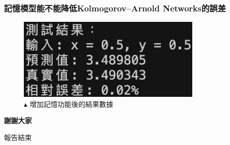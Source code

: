 \documentclass{beamer}
\begin{document}
\begin{frame}
    \frametitle{記憶模型能不能降低Kolmogorov–Arnold Networks的誤差}
    \begin{figure}
        \centering
        \begin{minipage}{\textwidth}
            \includegraphics[width=0.8\textwidth,keepaspectratio]{figures/增加記憶功能後的結果.jpg}
            \centering
            \caption*{$\blacktriangle$ 增加記憶功能後的結果數據}
        \end{minipage}
    \end{figure}
\end{frame}

\begin{frame}
    \begin{center}
        \Huge\textbf{謝謝大家}
        
        \vspace{1em}
        \Large 報告結束
    \end{center}
\end{frame}
\end{document}
